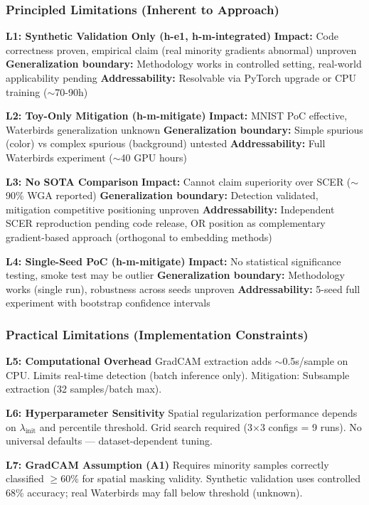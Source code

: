 \subsubsection{Principled Limitations (Inherent to Approach)}

\textbf{L1: Synthetic Validation Only (h-e1, h-m-integrated)}
\textbf{Impact:} Code correctness proven, empirical claim (real minority gradients abnormal) unproven
\textbf{Generalization boundary:} Methodology works in controlled setting, real-world applicability pending
\textbf{Addressability:} Resolvable via PyTorch upgrade or CPU training ($\sim$70-90h)

\textbf{L2: Toy-Only Mitigation (h-m-mitigate)}
\textbf{Impact:} MNIST PoC effective, Waterbirds generalization unknown
\textbf{Generalization boundary:} Simple spurious (color) vs complex spurious (background) untested
\textbf{Addressability:} Full Waterbirds experiment ($\sim$40 GPU hours)

\textbf{L3: No SOTA Comparison}
\textbf{Impact:} Cannot claim superiority over SCER ($\sim$90\% WGA reported)
\textbf{Generalization boundary:} Detection validated, mitigation competitive positioning unproven
\textbf{Addressability:} Independent SCER reproduction pending code release, OR position as complementary gradient-based approach (orthogonal to embedding methods)

\textbf{L4: Single-Seed PoC (h-m-mitigate)}
\textbf{Impact:} No statistical significance testing, smoke test may be outlier
\textbf{Generalization boundary:} Methodology works (single run), robustness across seeds unproven
\textbf{Addressability:} 5-seed full experiment with bootstrap confidence intervals

\subsubsection{Practical Limitations (Implementation Constraints)}

\textbf{L5: Computational Overhead}
GradCAM extraction adds $\sim$0.5s/sample on CPU. Limits real-time detection (batch inference only). Mitigation: Subsample extraction (32 samples/batch max).

\textbf{L6: Hyperparameter Sensitivity}
Spatial regularization performance depends on $\lambda_{\text{init}}$ and percentile threshold. Grid search required (3$\times$3 configs = 9 runs). No universal defaults --- dataset-dependent tuning.

\textbf{L7: GradCAM Assumption (A1)}
Requires minority samples correctly classified $\geq$60\% for spatial masking validity. Synthetic validation uses controlled 68\% accuracy; real Waterbirds may fall below threshold (unknown).

